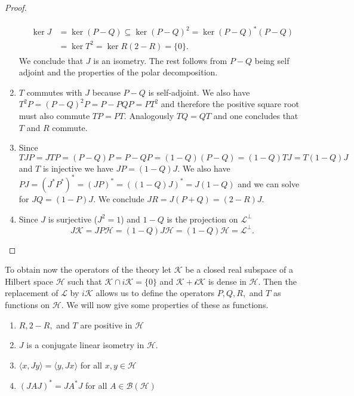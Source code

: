 \begin{proof}
\begin{enumerate}
\begin{align}
\begin{split}
\ker J&=\ker (P-Q)\subseteq\ker(P-Q)^2=\ker(P-Q)^*(P-Q) \\
&=\ker T^2=\ker R(2-R)=\{0\}.
\end{split}
\end{align}
We conclude that $J$ is an isometry. The rest follows from $P-Q$ being self adjoint and the properties of the polar decomposition.
\item $T$ commutes with $J$ because $P-Q$ is self-adjoint. We also have $T^2P=(P-Q)^2P=P-PQP=PT^2$ and therefore the positive square root must also commute $TP=PT$. Analogously $TQ=QT$ and one concludes that $T$ and $R$ commute.
\item Since $TJP=JTP=(P-Q)P=P-QP=(1-Q)(P-Q)=(1-Q)TJ=T(1-Q)J$ and $T$ is injective we have $JP=(1-Q)J$. We also have $PJ=(J^*P^*)^*=(JP)^*=((1-Q)J)^*=J(1-Q)$ and we can solve for $JQ=(1-P)J$. We conclude $JR=J(P+Q)=(2-R)J.$
\item Since $J$ is surjective ($J^2=1$) and $1-Q$ is the projection on $\mathcal{L}^\bot$ 
\begin{equation}
J\mathcal{K}=JP\mathcal{H}=(1-Q)J\mathcal{H}=(1-Q)\mathcal{H}=\mathcal{L}^\bot.
\end{equation}
\end{enumerate}
\end{proof}

To obtain now the operators of the theory let $\mathcal{K}$ be a closed real subspace of a Hilbert space $\mathcal{H}$ such that $\mathcal{K}\cap i\mathcal{K}=\{0\}$ and $\mathcal{K}+\mathcal{iK}$ is dense in $\mathcal{H}$. Then the replacement of $\mathcal{L}$ by $i\mathcal{K}$ allows us to define the operators $P,Q,R,$ and $T$ as functions on $\mathcal{H}$. We will now give some properties of these as functions.  

\begin{theorem}
\begin{enumerate}
\item $R,2-R,$ and $T$ are positive in $\mathcal{H}$
\item $J$ is a conjugate linear isometry in $\mathcal{H}$.
\item $\langle x, Jy\rangle=\langle y, Jx\rangle$ for all $x,y\in\mathcal{H}$ 
\item $(JAJ)^*=JA^*J$ for all $A\in\mathcal{B}(\mathcal{H})$
\end{enumerate}
\end{theorem}

